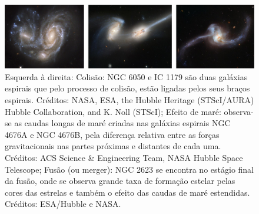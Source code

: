 \begin{figure}[!h] 
  \centering 
  \includegraphics[width=1.0\textwidth]{Imagens/int_08.png} 
  \caption[Interação entre galáxias.]{Esquerda à direita: Colisão: NGC 6050 e IC 1179 são duas galáxias espirais que pelo processo de colisão, estão ligadas pelos seus braços espirais. Créditos: NASA, ESA, the Hubble Heritage (STScI/AURA) Hubble Collaboration, and K. Noll (STScI); Efeito de maré: observa-se as caudas longas de maré criadas nas galáxias espirais NGC 4676A e NGC 4676B, pela diferença relativa entre as forças gravitacionais nas partes próximas e distantes de cada uma. Créditos: ACS Science \& Engineering Team, NASA Hubble Space Telescope; Fusão (ou merger): NGC 2623 se encontra no estágio final da fusão, onde se observa grande taxa de formação estelar pelas cores das estrelas e também o efeito das caudas de maré estendidas. Créditos: ESA/Hubble e NASA.}
  \label{fig:interações} 
\end{figure}

